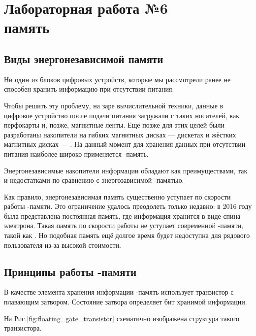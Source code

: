 \chapter{Лабораторная работа №6\\ память} 

\section{Виды энергонезависимой памяти}

\par{Ни один из блоков цифровых устройств, которые мы рассмотрели ранее не способен хранить информацию при отсутствии питания.}

\par{Чтобы решить эту проблему, на заре вычислительной техники, данные в цифровое устройство после подачи питания загружали с таких носителей, как перфокарты и, позже, магнитные ленты. Ещё позже для этих целей были разработаны накопители на гибких магнитных дисках --- дискетах и жёстких магнитных дисках --- . На данный момент для хранения данных при отсутствии питания наиболее широко применяется -память.}

\par{Энергонезависимые накопители информации обладают как преимуществами, так и недостатками по сравнению с энергозависимой -памятью.} 

\par{Как правило, энергонезависимая память существенно уступает по скорости работы -памяти. Это ограничение удалось преодолеть только недавно: в 2016 году была представлена постоянная память, где информация хранится в виде спина электрона. Такая память по скорости работы не уступает современной -памяти, такой как . Но подобная память ещё долгое время будет  недоступна для рядового пользователя из-за высокой стоимости.}

\section{Принципы работы -памяти}

\par{В качестве элемента хранения информации -память использует транзистор с плавающим затвором. Состояние затвора определяет бит хранимой информации.}
\par{На Рис.\ref{fig:floating_gate_transistor} схематично изображена структура такого транзистора.}


